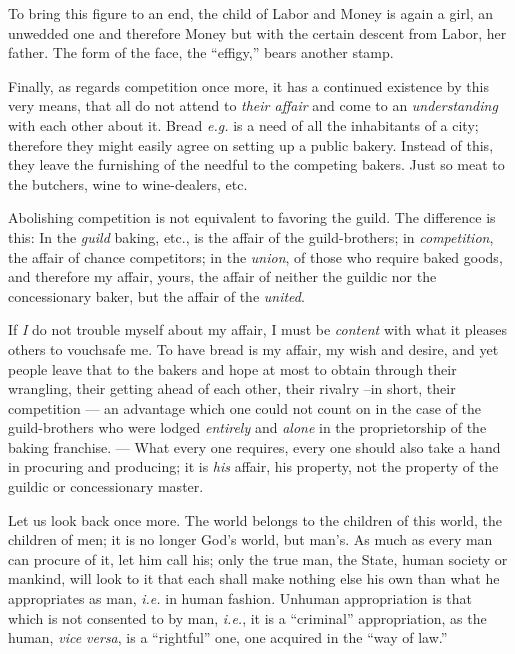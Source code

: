 To bring this figure to an end, the child of Labor and Money is again a girl, 
an unwedded one and therefore Money but with the certain descent from Labor, 
her father. The form of the face, the ``effigy,'' bears another stamp.

Finally, as regards competition once more, it has a continued existence by 
this very means, that all do not attend to \textit{their affair} and come to 
an \textit{understanding} with each other about it. Bread \textit{e.g.} is a 
need of all the inhabitants of a city; therefore they might easily agree on 
setting up a public bakery. Instead of this, they leave the furnishing of the 
needful to the competing bakers. Just so meat to the butchers, wine to 
wine-dealers, etc.

Abolishing competition is not equivalent to favoring the guild. The difference 
is this: In the \textit{guild} baking, etc., is the affair of the 
guild-brothers; in \textit{competition}, the affair of chance competitors; in 
the \textit{union}, of those who require baked goods, and therefore my affair, 
yours, the affair of neither the guildic nor the concessionary baker, but the 
affair of the \textit{united}.

If \textit{I} do not trouble myself about my affair, I must be 
\textit{content} with what it pleases others to vouchsafe me. To have bread is 
my affair, my wish and desire, and yet people leave that to the bakers and 
hope at most to obtain through their wrangling, their getting ahead of each 
other, their rivalry --in short, their competition --- an advantage which one 
could not count on in the case of the guild-brothers who were lodged 
\textit{entirely} and \textit{alone} in the proprietorship of the baking 
franchise. --- What every one requires, every one should also take a hand in 
procuring and producing; it is \textit{his} affair, his property, not the 
property of the guildic or concessionary master.

Let us look back once more. The world belongs to the children of this world, 
the children of men; it is no longer God's world, but man's. As much as every 
man can procure of it, let him call his; only the true man, the State, human 
society or mankind, will look to it that each shall make nothing else his own 
than what he appropriates as man, \textit{i.e.} in human fashion. Unhuman 
appropriation is that which is not consented to by man, \textit{i.e.}, it is a 
``criminal'' appropriation, as the human, \textit{vice versa}, is a 
``rightful'' one, one acquired in the ``way of law.''

